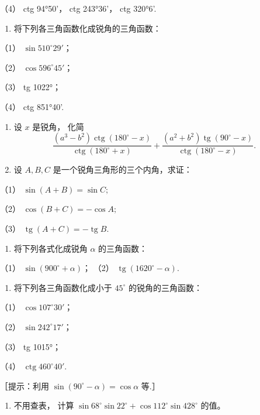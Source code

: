 （4） ctg 94°50'， ctg 243°36'， ctg 320°6'.

\begin{enumerate}[start=2]
\item
  将下列各三角函数化成锐角的三角函数：
\end{enumerate}

（1） \(\sin 510^{\circ}29'\)；

（2） \(\cos 596^{\circ}45'\)；

（3） tg 1022°；

（4） ctg 851°40'.

\begin{enumerate}[start=3]
\item
  设 \(x\) 是锐角， 化简
\[
\frac {(a ^ {3} - b ^ {2}) \operatorname{ctg} (180 ^{\circ} - x)}{\operatorname{ctg} (180 ^{\circ} + x)} + \frac {(a ^ {2} + b ^ {2}) \operatorname{tg} (90 ^{\circ} - x)}{\operatorname{ctg} (180 ^{\circ} - x)}.
\]
\item
  设 \(A, B, C\) 是一个锐角三角形的三个内角，求证：
\end{enumerate}

（1） \(\sin (A + B) = \sin C;\)

（2） \(\cos (B + C) = -\cos A;\)

（3） \(\operatorname{tg}(A + C) = -\operatorname{tg} B.\)

\begin{enumerate}[start=5]
\item
  将下列各式化成锐角 \(\alpha\) 的三角函数：
\end{enumerate}

（1） \(\sin (900^{\circ} + \alpha)\)； （2）
\(\operatorname{tg}(1620^{\circ} - \alpha)\).

\begin{enumerate}[start=6]
\item
  将下列各三角函数化成小于 \(45^{\circ}\) 的锐角的三角函数：
\end{enumerate}

（1） \(\cos 107^{\circ}30'\)；

（2） \(\sin 242^{\circ}17'\)；

（3） tg 1015°；

（4） \(\operatorname{ctg} 460^{\circ}40'\).

［提示：利用 \(\sin (90^{\circ} - \alpha) = \cos \alpha\) 等.］

\begin{enumerate}[start=7]
\item
  不用查表， 计算
  \(\sin 68^{\circ} \sin 22^{\circ} + \cos 112^{\circ} \sin 428^{\circ}\)
  的值。
\end{enumerate}

